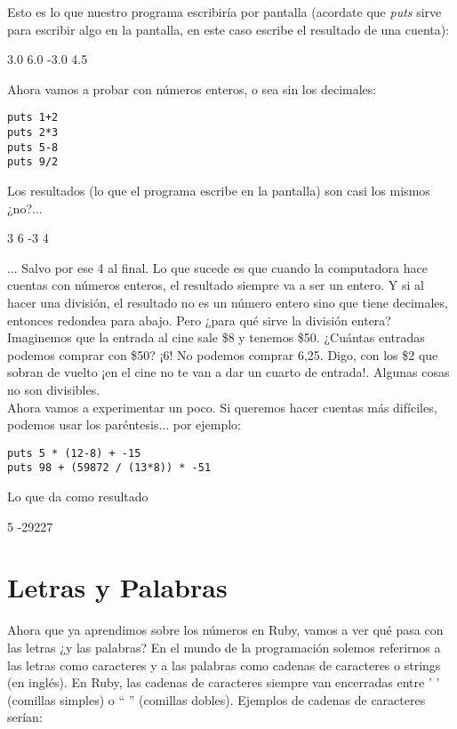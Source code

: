 Esto es lo que nuestro programa escribiría por pantalla (acordate que \emph{puts} sirve para escribir algo en la pantalla, en este caso escribe el resultado de una cuenta):
\begin{console-output}
3.0
6.0
-3.0
4.5
\end{console-output}

Ahora vamos a probar con números enteros, o sea sin los decimales:

\begin{lstlisting}
puts 1+2
puts 2*3
puts 5-8
puts 9/2
\end{lstlisting}

Los resultados (lo que el programa escribe en la pantalla) son casi los mismos ¿no?...

\begin{console-output}
3
6
-3
4
\end{console-output}

... Salvo por ese 4 al final. Lo que sucede es que cuando la computadora hace cuentas con números enteros, el resultado siempre va a ser un entero. Y si  al hacer una división, el resultado no es un número entero sino que tiene decimales, entonces redondea para abajo. Pero ¿para qué sirve la división entera?\\

Imaginemos que la entrada al cine sale \$8 y tenemos \$50. ¿Cuántas entradas podemos comprar con \$50? ¡6! No podemos comprar 6,25. Digo, con los \$2 que sobran de vuelto ¡en el cine no te van a dar un cuarto de entrada!. Algunas cosas no son divisibles.\\

Ahora vamos a experimentar un poco. Si queremos hacer cuentas más difíciles, podemos usar los paréntesis... por ejemplo:

\begin{lstlisting}
puts 5 * (12-8) + -15
puts 98 + (59872 / (13*8)) * -51
\end{lstlisting}

Lo que da como resultado
\begin{console-output}
5
-29227
\end{console-output}

\section{Letras y Palabras}
Ahora que ya aprendimos sobre los números en Ruby, vamos a ver qué pasa con las letras ¿y las palabras? En el mundo de la programación solemos referirnos a las letras como caracteres y a las palabras como cadenas de caracteres o strings (en inglés). En Ruby, las cadenas de caracteres siempre van encerradas entre ' ' (comillas simples) o “ ” (comillas dobles). Ejemplos de cadenas de caracteres serían:

